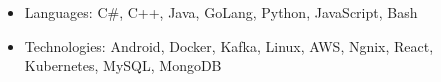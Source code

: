 

\begin{cvparagraph}

\begin{itemize}
  \item Languages: C\#, C++, Java, GoLang, Python, JavaScript, Bash
  \item Technologies: Android, Docker, Kafka, Linux,  AWS, Ngnix, React, Kubernetes, MySQL, MongoDB
\end{itemize}
\end{cvparagraph}

